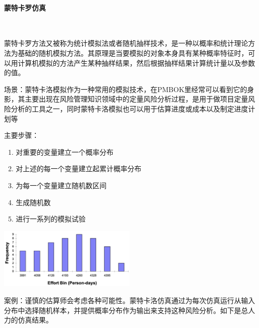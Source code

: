 \paragraph{蒙特卡罗仿真}~{} \par
蒙特卡罗方法又被称为统计模拟法或者随机抽样技术，是一种以概率和统计理论方法为基础的随机模拟方法。其原理是当要模拟的对象本身具有某种概率特征时，可以用计算机模拟的方法产生某种抽样结果，然后根据抽样结果计算统计量以及参数的值。

场景：蒙特卡洛模拟作为一种常用的模拟技术，在PMBOK里经常可以看到它的身影，其主要出现在风险管理知识领域中的定量风险分析过程，是用于做项目定量风险分析的工具之一，同时蒙特卡洛模拟也可以用于估算进度或成本以及制定进度计划等

主要步骤：
\vspace{-0.8em}
\begin{multicols}{2}
    \begin{enumerate}[label=\arabic*.]
        \item 对重要的变量建立一个概率分布
        \item 对上述的每一个变量建立起累计概率分布
        \item 为每一个变量建立随机数区间
        \item 生成随机数
        \item 进行一系列的模拟试验
    \end{enumerate}
\end{multicols}
\vspace{-1em}

\begin{table}
    \centering
    \vspace{-3em}
    \includegraphics[width=0.5\textwidth]{images/蒙特卡洛仿真示例.png}
    \vspace{-4em}
\end{table}
案例：谨慎的估算师会考虑各种可能性。蒙特卡洛仿真通过为每次仿真运行从输入分布中选择随机样本，并提供概率分布作为输出来支持这种风险分析。如下是总人力的仿真结果。

